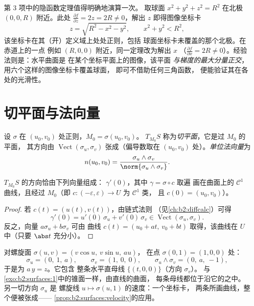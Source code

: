 \begin{example}[从水平集到图像]
\label{ex:b2:surfaces:levelgraph}
第 3 项中的隐函数定理值得明确地演算一次。
取球面 $x^2 + y^2 + z^2 = R^2$ 在北极
$(0, 0, R)$ 附近。此处 $\frac{\partial f}{\partial z} = 2z =
2R \neq 0$，解出 $z$ 即得图像坐标卡
\[
z = \sqrt{R^2 - x^2 - y^2},
\qquad x^2 + y^2 < R^2 ,
\]
该坐标卡在其（开）定义域上处处正则，包括
球面坐标卡未覆盖的那个北极。在赤道上的一点
例如 $(R, 0, 0)$ 附近，同一定理改为解出 $x$
（$\frac{\partial f}{\partial x} = 2R \neq 0$）。经验法则是：水平曲面是
在某个坐标平面上的图像，该平面
\emph{与梯度的最大分量正交}，
用六个这样的图像坐标卡覆盖球面，
即可不借助任何三角函数，
便能验证其在各处的光滑性。
\end{example}

\section{切平面与法向量}

\begin{definition}[切平面]\label{def:b2:surfaces:tangent}
设 $\sigma$ 在 $(u_0, v_0)$ 处正则，$M_0 = \sigma(u_0, v_0)$。
$T_{M_0}S$ 称为\emph{切平面}，它是过 $M_0$ 的平面，
其方向由 $\operatorname{Vect}(\sigma_u, \sigma_v)$ 张成（偏导数取在
$(u_0, v_0)$ 处）。\emph{单位法向量}为
\[
n(u_0, v_0)
= \frac{\sigma_u \wedge \sigma_v}
       {\norm{\sigma_u \wedge \sigma_v}} .
\]
\end{definition}

\begin{proposition}[切向量是速度
向量]\label{prop:b2:surfaces:velocity}
$T_{M_0}S$ 的方向恰由下列向量组成：
$\gamma'(0)$，其中 $\gamma = \sigma \circ c$ 取遍
画在曲面上的 $\mathcal{C}^1$ 曲线，且经过 $M_0$（即
$c \colon (-\varepsilon, \varepsilon) \to U$ 为 $\mathcal{C}^1$ 类，
且 $c(0) = (u_0, v_0)$）。
\end{proposition}

\begin{proof}
若 $c(t) = (u(t), v(t))$，由链式法则
（见\cref{ch:b2:diffcalc}）可得
\[
\gamma'(0) = u'(0)\,\sigma_u + v'(0)\,\sigma_v
\in \operatorname{Vect}(\sigma_u, \sigma_v).
\]
反之，向量 $a\sigma_u + b\sigma_v$ 可由
曲线 $c(t) = (u_0 + at,\ v_0 + bt)$ 取得，该曲线在
$U$ 中（只要 $\abs t$ 充分小）。
\end{proof}

\begin{example}[螺旋面的切平面]
\label{ex:b2:surfaces:helicoidtangent}
对螺旋面 $\sigma(u, v) = (v\cos u,\ v\sin u,\ au)$，
在点 $\sigma(0, 1) = (1, 0, 0)$ 处：
\[
\sigma_u = (0,\ 1,\ a), \qquad \sigma_v = (1,\ 0,\ 0),
\qquad
\sigma_u \wedge \sigma_v = (0,\ a,\ -1),
\]
于是为 $a\,y = z$。它包含
整条水平直母线 $\{(t, 0, 0)\}$（方向 $\sigma_v$）。
与\cref{exo:b2:surfaces:1}中的锥面一样，由直线的曲面，
每条母线都位于沿它的之中。
另一切方向 $\sigma_u$ 是
螺旋线 $u \mapsto \sigma(u, 1)$ 的速度：一个坐标卡，
两条所画曲线，整个便被张成——
\cref{prop:b2:surfaces:velocity}的应用。
\end{example}

